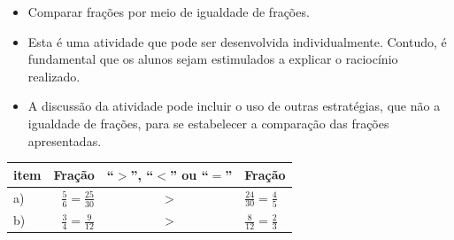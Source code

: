 \begin{multicols}{2}
\begin{solucao}{}{}
\end{solucao}



\begin{objetivos}[label=chap4-ativ13]{}{}
\begin{itemize} %
    \item       Comparar frações por meio de igualdade de frações.
\end{itemize} %
\end{objetivos}

\begin{orientacoes}{}{}
\begin{itemize} %
    \item       Esta é uma atividade que pode ser desenvolvida individualmente.
Contudo, é fundamental que os alunos sejam estimulados a explicar o raciocínio
realizado.
    \item       A discussão da atividade pode incluir o uso de outras
estratégias, que não a igualdade de frações, para se estabelecer a comparação
das frações apresentadas.
\end{itemize} %





\end{orientacoes}


\begin{solucao}{}{}

\noindent
    \begin{tabular}{lrcl}

       item &  Fração &  ``$>$'', ``$<$'' ou ``$=$'' &  Fração \\
      \hline
       a) &  $\frac{5}{6} = \frac{25}{30}$ &   $>$  &  $\frac{24}{30} =
\frac{4}{5}$ \\

       b) &  $\frac{3}{4} = \frac{9}{12}$ &   $>$  &  $\frac{8}{12} =
\frac{2}{3}$ \\


\end{tabular}
\end{solucao}
\end{multicols}

